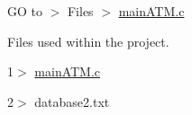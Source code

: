 GO to \texorpdfstring{$>$}{>} Files \texorpdfstring{$>$}{>} \mbox{\hyperlink{main_a_t_m_8c}{main\+ATM.\+c}}

Files used within the project.

1\texorpdfstring{$>$}{>} \mbox{\hyperlink{main_a_t_m_8c}{main\+ATM.\+c}}

2\texorpdfstring{$>$}{>} database2.\+txt 